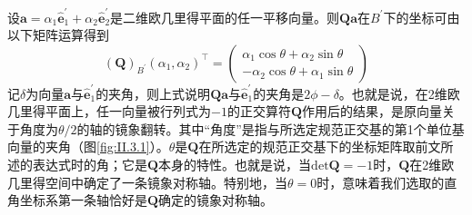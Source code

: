 \documentclass[main.tex]{subfiles}
\begin{document}
设$\mathbf{a}=\alpha_1\mathbf{\hat{e}}^\prime_1+\alpha_2\mathbf{\hat{e}}^\prime_2$是二维欧几里得平面的任一平移向量。则$\mathbf{Qa}$在$B^\prime$下的坐标可由以下矩阵运算得到
\[\left(\mathbf{Q}\right)_{B^\prime}\left(\alpha_1,\alpha_2\right)^\intercal=\left(\begin{array}{c}\alpha_1\cos\theta+\alpha_2\sin\theta\\-\alpha_2\cos\theta+\alpha_1\sin\theta\end{array}\right)\]
记$\delta$为向量$\mathbf{a}$与$\mathbf{\hat{e}}^\prime_1$的夹角，则上式说明$\mathbf{Qa}$与$\mathbf{\hat{e}}^\prime_1$的夹角是$2\phi-\delta$。也就是说，在2维欧几里得平面上，任一向量被行列式为$-1$的正交算符$\mathbf{Q}$作用后的结果，是原向量关于角度为$\theta/2$的轴的镜象翻转。其中“角度”是指与所选定规范正交基的第1个单位基向量的夹角（图\ref{fig:II.3.1}）。$\theta$是$\mathbf{Q}$在所选定的规范正交基下的坐标矩阵取前文所述的表达式时的角；它是$\mathbf{Q}$本身的特性。也就是说，当$\mathrm{det}\mathbf{Q}=-1$时，$\mathbf{Q}$在2维欧几里得空间中确定了一条镜象对称轴。特别地，当$\theta=0$时，意味着我们选取的直角坐标系第一条轴恰好是$\mathbf{Q}$确定的镜象对称轴。
\end{document}
